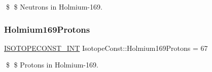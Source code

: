 \$ \$ Neutrons in Holmium-\/169. \mbox{\label{group___isotope_const-_holmium-_ho169_ga795061f45ccce3eb5389e0ea7ff6410b}} 
\subsubsection{\texorpdfstring{Holmium169\+Protons}{Holmium169Protons}}
{\footnotesize\ttfamily \mbox{\hyperlink{group___isotope_const-_macros_ga5f18360b3e99483a35c32d789e62621c}{I\+S\+O\+T\+O\+P\+E\+C\+O\+N\+S\+T\+\_\+\+I\+NT}} Isotope\+Const\+::\+Holmium169\+Protons = 67}

\$ \$ Protons in Holmium-\/169. 